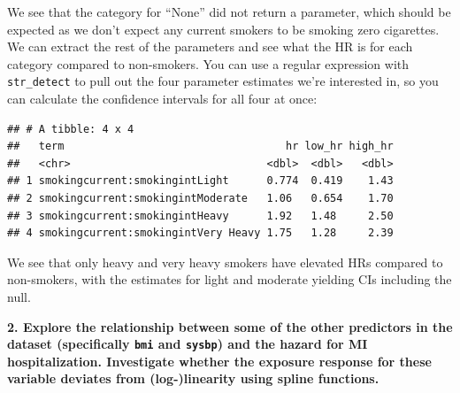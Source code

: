 \documentclass[
]{book}
\newenvironment{Shaded}{\begin{snugshade}}{\end{snugshade}}
\newcommand{\DataTypeTok}[1]{\textcolor[rgb]{0.13,0.29,0.53}{#1}}
\newcommand{\FloatTok}[1]{\textcolor[rgb]{0.00,0.00,0.81}{#1}}
\newcommand{\KeywordTok}[1]{\textcolor[rgb]{0.13,0.29,0.53}{\textbf{#1}}}
\newcommand{\NormalTok}[1]{#1}
\newcommand{\OperatorTok}[1]{\textcolor[rgb]{0.81,0.36,0.00}{\textbf{#1}}}
\newcommand{\StringTok}[1]{\textcolor[rgb]{0.31,0.60,0.02}{#1}}
\begin{document}
We see that the category for ``None'' did not return a parameter, which should be expected as we don't expect any current smokers to be smoking zero cigarettes. We can extract the rest of the parameters and see what the HR is for each category compared to non-smokers. You can use a regular expression with \texttt{str\_detect} to pull out the four parameter estimates we're interested in, so you can calculate the confidence intervals for all four at once:

\begin{Shaded}
\end{Shaded}

\begin{verbatim}
## # A tibble: 4 x 4
##   term                                   hr low_hr high_hr
##   <chr>                               <dbl>  <dbl>   <dbl>
## 1 smokingcurrent:smokingintLight      0.774  0.419    1.43
## 2 smokingcurrent:smokingintModerate   1.06   0.654    1.70
## 3 smokingcurrent:smokingintHeavy      1.92   1.48     2.50
## 4 smokingcurrent:smokingintVery Heavy 1.75   1.28     2.39
\end{verbatim}

We see that only heavy and very heavy smokers have elevated HRs compared to non-smokers, with the estimates for light and moderate yielding CIs including the null.

\textbf{2. Explore the relationship between some of the other predictors in the dataset (specifically \texttt{bmi} and \texttt{sysbp}) and the hazard for MI hospitalization. Investigate whether the exposure response for these variable deviates from (log-)linearity using spline functions.}
\end{document}
